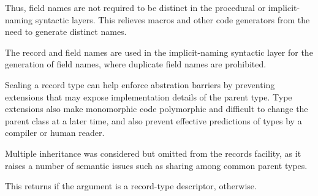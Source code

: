 \begin{entry}{%
}
\begin{rationale}
  Thus, field names are not required to be distinct in the procedural or
  implicit-naming syntactic layers.
  This relieves macros and other code generators from the need to
  generate distinct names.

  The record and field names are used in the implicit-naming syntactic
  layer for the generation of field names, where duplicate field names are
  prohibited.
\end{rationale}

\begin{rationale}
  Sealing a record type can help enforce abstration barriers by preventing
  extensions that may expose implementation details of the parent type.
  Type extensions also make monomorphic code polymorphic and
  difficult to change the parent class at a later time, and also
  prevent effective predictions of types by a compiler or human
  reader.
\end{rationale}

\begin{rationale}
  Multiple inheritance was considered but omitted from the records
  facility, as it raises a number of semantic issues such as
  sharing among common parent types.
\end{rationale}
\end{entry}

\begin{entry}{%
}
   
This returns \schtrue{} if the argument is a record-type descriptor,
\schfalse{} otherwise.
\end{entry}

